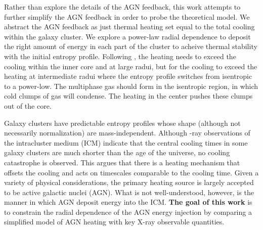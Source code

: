 \documentclass[iop,apjl, twocolappendix]{emulateapj}   %
\begin{document}
Rather than explore the details of the AGN feedback, this work attempts to
further simplify the AGN feedback in order to probe the theoretical model. We
abstract the AGN feedback as just thermal heating set equal to the total
cooling within the galaxy cluster. We explore a power-law radial dependence to
deposit the right amount of energy in each part of the cluster to acheive
thermal stability with the initial entropy profile. Following
\citep{voit_global_2017},  the heating needs to exceed the cooling within the
inner core and at large radui, but for the cooling to exceed the heating at
intermediate radui where the entropy profile switches from isentropic to a
power-low. The multiphase gas should form in the isentropic region, in which
cold clumps of gas will condense. The heating in the center pushes these
clumps out of the core.

Galaxy clusters have predictable entropy profiles whose shape (although not
necessarily normalization) are mass-independent.
\cite{cavagnolo_intracluster_2009} Although -ray observations of the
intracluster medium (ICM) indicate that the central cooling times  in some
galaxy clusters are much shorter than the age of the universe, no cooling
catastrophe is observed. This argues that there is a heating mechanism that
offsets the cooling and acts on timescales comparable to the cooling time.
Given a variety of physical considerations, the primary heating source is
largely accepted to be active galactic nuclei (AGN).  What is not
well-understood, however, is the manner in which AGN deposit energy into the
ICM.   \textbf{The goal of this work} is to constrain the radial dependence of
the AGN energy injection by comparing a simplified model of AGN heating with
key X-ray observable quantities. 
\end{document}
